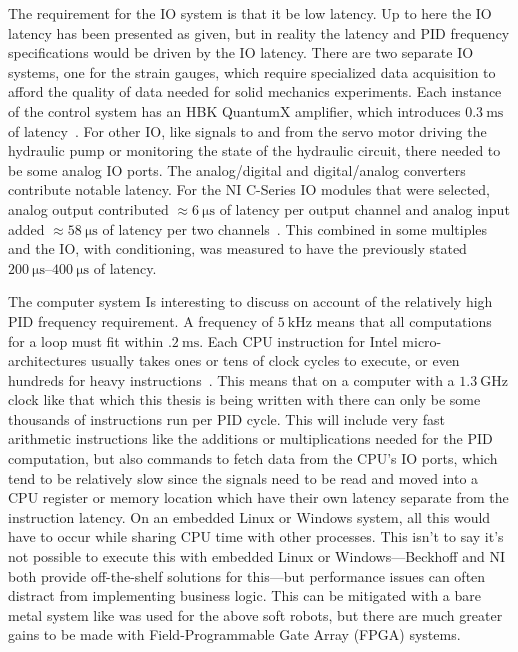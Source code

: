 \documentclass[english,12pt,a4paper,pdftex,eng,utf8]{aaltothesis}
\begin{document}
The requirement for the IO system is that it be low latency.  Up to here the IO latency has been presented as given, but in reality the latency and PID
frequency specifications would be driven by the IO latency.  There are two separate IO systems, one for the strain gauges, which require specialized data acquisition to afford the quality of data needed for solid mechanics experiments.  Each instance of the control system has an HBK QuantumX amplifier, which introduces $\qty{0.3}{\milli\second}$ of latency~\cite{HBKQuantumX}.  For other IO, like signals to and from the servo motor driving the hydraulic pump or monitoring the state of the hydraulic circuit, there needed to be some analog IO ports.  The analog/digital and digital/analog converters contribute notable latency.  For the NI C-Series IO modules that were selected, analog output contributed $\approx\qty{6}{\micro\second}$ of latency per output channel and analog input added $\approx\qty{58}{\micro\second}$ of latency per two channels~\cite{NI-9220,NI-9266}.  This combined in some multiples and the IO, with conditioning, was measured to have the previously stated $ \qtyrange[range-units=single,range-phrase=..]{200}{400}{\micro\second}$ of latency.

The computer system Is interesting to discuss on account of the relatively high PID frequency requirement.  A frequency of $\qty{5}{\kilo\hertz}$ means that all computations for a loop must fit within $\qty{.2}{\milli\second}$.  Each CPU instruction for Intel micro-architectures usually takes ones or tens of clock cycles to execute, or even hundreds for heavy instructions~\cite{Abel19a}.  This means that on a computer with a $\qty{1.3}{\giga\hertz}$ clock like that which this thesis is being written with there can only be some thousands of instructions run per PID cycle.  This will include very fast arithmetic instructions like the additions or multiplications needed for the PID computation, but also commands to fetch data from the CPU's IO ports, which tend to be relatively slow since the signals need to be read and moved into a CPU register or memory location which have their own latency separate from the instruction latency.  On an embedded Linux or Windows system, all this would have to occur while sharing CPU time with other processes.  This isn't to say it's not possible to execute this with embedded Linux or Windows---Beckhoff and NI both provide off-the-shelf solutions for this---but performance issues can often distract from implementing business logic.  This can be mitigated with a bare metal system like was used for the above soft robots, but there are much greater gains to be made with Field-Programmable Gate Array (FPGA) systems.
\end{document}
